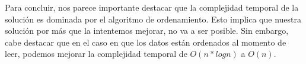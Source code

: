 Para concluir, nos parece importante destacar que la complejidad temporal de la solución es dominada por el algoritmo de ordenamiento. Esto implica que nuestra solución por más que la intentemos mejorar, no va a ser posible. Sin embargo, cabe destacar que en el caso en que los datos están ordenados al momento de leer, podemos mejorar la complejidad temporal de $O(n * log n)$ a $O(n)$.